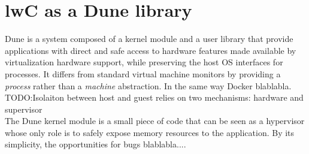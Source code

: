 \documentclass[letterpaper,twocolumn,10pt]{article}
\begin{document}
%
%
%
%

\section{lwC as a Dune library}

Dune is a system composed of a kernel module and a user library that provide applications with direct and safe access to hardware features made available by virtualization hardware support, while preserving the host OS interfaces for processes.
It differs from standard virtual machine monitors by providing a \emph{process} rather than a \emph{machine} abstraction. 
In the same way Docker blablabla.\\

TODO:Isolaiton between host and guest relies on two mechanisms: hardware and supervisor \\

The Dune kernel module is a small piece of code that can be seen as a hypervisor whose only role is to safely expose memory resources to the application.
By its simplicity, the opportunities for bugs blablabla....\\
\end{document}
